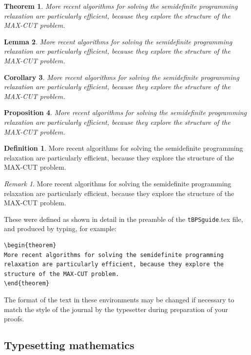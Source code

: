 \documentclass{tBPS2e}
\theoremstyle{plain}
\newtheorem{theorem}{Theorem}[section]
\newtheorem{lemma}[theorem]{Lemma}
\newtheorem{corollary}[theorem]{Corollary}
\newtheorem{proposition}[theorem]{Proposition}
\theoremstyle{definition}
\newtheorem{definition}{Definition}
\theoremstyle{remark}
\newtheorem{remark}{Remark}
\begin{document}
\begin{theorem}
More recent algorithms for solving the semidefinite programming
relaxation are particularly efficient, because they explore the
structure of the MAX-CUT problem.
\end{theorem}
\begin{lemma}
More recent algorithms for solving the semidefinite programming
relaxation are particularly efficient, because they explore the
structure of the MAX-CUT problem.
\end{lemma}
\begin{corollary}
More recent algorithms for solving the semidefinite programming
relaxation are particularly efficient, because they explore the
structure of the MAX-CUT problem.
\end{corollary}
\begin{proposition}
More recent algorithms for solving the semidefinite programming
relaxation are particularly efficient, because they explore the
structure of the MAX-CUT problem.
\end{proposition}
\begin{definition}
More recent algorithms for solving the semidefinite programming
relaxation are particularly efficient, because they explore the
structure of the MAX-CUT problem.
\end{definition}
\begin{remark}
More recent algorithms for solving the semidefinite programming
relaxation are particularly efficient, because they explore the
structure of the MAX-CUT problem.
\end{remark}

\noindent These were defined as shown in detail in the preamble of the \texttt{tBPSguide}.tex file, and produced by typing, for example:
\begin{verbatim}
\begin{theorem}
More recent algorithms for solving the semidefinite programming
relaxation are particularly efficient, because they explore the
structure of the MAX-CUT problem.
\end{theorem}
\end{verbatim}
The format of the text in these environments may be changed if necessary to match the style of the journal by the typesetter during preparation of your proofs.


\subsection{Typesetting mathematics}\label{TMth}
\end{document}
